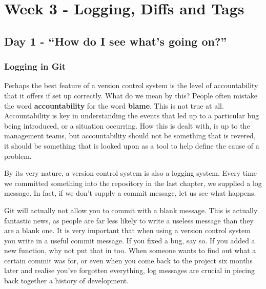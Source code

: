 \cleardoublepage
\chapter{Week 3 - Logging, Diffs and Tags}
\section{Day 1 - ``How do I see what's going on?''}
\subsection{Logging in Git}
Perhaps the best feature of a version control system is the level of accountability that it offers if set up correctly.
What do we mean by this? People often mistake the word \textbf{accountability} for the word \textbf{blame}.
This is not true at all.
Accountability is key in understanding the events that led up to a particular bug being introduced, or a situation occurring.
How this is dealt with, is up to the management teams, but accountability should not be something that is revered, it should be something that is looked upon as a tool to help define the cause of a problem.

By its very nature, a version control system is also a logging system.
Every time we committed something into the repository in the last chapter, we supplied a log message.
In fact, if we don't supply a commit message, let us see what happens.


Git will actually not allow you to commit with a blank message.
This is actually fantastic news, as people are far less likely to write a useless message than they are a blank one.
It is very important that when using a version control system you write in a useful commit message.
If you fixed a bug, say so.
If you added a new function, why not put that in too.
When someone wants to find out what a certain commit was for, or even when you come back to the project six months later and realise you've forgotten everything, log messages are crucial in piecing back together a history of development.

